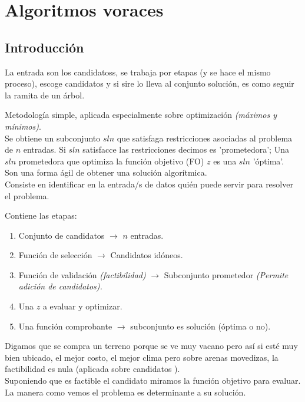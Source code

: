 \chapter{Algoritmos voraces}
\section{Introducción}
La entrada son los candidatoss, se trabaja por etapas (y se hace el mismo proceso), escoge candidatos y si sire lo lleva al conjunto solución, es como seguir la ramita de un árbol.

Metodología simple, aplicada especialmente sobre optimización \textit{(máximos y mínimos)}.\\
Se obtiene un subconjunto $sln$ que satisfaga restricciones asociadas al problema de $n$ entradas. Si $sln$ satisfacce las restricciones decimos es 'prometedora'; Una $sln$ prometedora que optimiza la función objetivo (FO) $z$ es una $sln$ 'óptima'.
\\
Son una forma ágil de obtener una solución algorítmica.\\
Consiste en identificar en la entrada/s de datos quién puede servir para resolver el problema.
\\
\begin{definition}[Elementos]
	Contiene las etapas:

	\begin{enumerate}
		\item Conjunto de candidatos $\to$ $n$ entradas.
		\item Función de selección $\to$ Candidatos idóneos.
		\item Función de validación \textit{(factibilidad)} $\to$ Subconjunto prometedor \textit{(Permite adición de candidatos).}
		\item Una $z$ a evaluar y optimizar.
		\item Una función comprobante $\to$ subconjunto es solución (óptima o no).
	\end{enumerate}
\end{definition}

Digamos que se compra un terreno porque se ve muy vacano pero así si esté muy bien ubicado, el mejor costo, el mejor clima pero
sobre arenas movedizas, la factibilidad es nula (aplicada sobre candidatos
).\\
Suponiendo que es factible el candidato miramos la función objetivo para evaluar.
\\
La manera como vemos el problema es determinante a su solución.
\\

